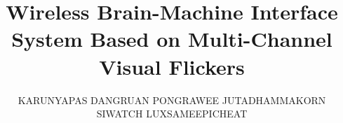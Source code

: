 \documentclass[a4paper,12pt,twoside]{report}
\begin{document}
\title{\LARGE {\bf Wireless Brain-Machine Interface System Based on Multi-Channel Visual Flickers}\\
 \vspace*{6mm}
}

\author{KARUNYAPAS\hspace{1cm}  DANGRUAN\newline
 		PONGRAWEE \hspace{0.5cm}  JUTADHAMMAKORN\newline
        SIWATCH \hspace{1cm}   LUXSAMEEPICHEAT}
        

\normallinespacing
\maketitle

\preface


%
%

\body










\appendix




\end{document}
